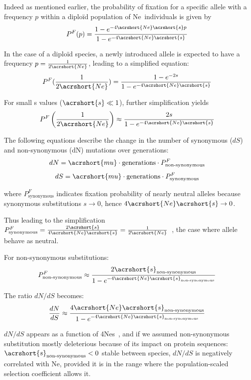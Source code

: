 Indeed as mentioned earlier, the probability of fixation for a specific allele with a frequency \( p \) within a \gls{diploïd} population of \acrshort{Ne}~individuals is given by
\[ P^F(p) = \frac{1 - e^{-4\acrshort{Ne}\acrshort{s} p}}{1 - e^{-4\acrshort{Ne}\acrshort{s}}} \]

In the case of a \gls{diploïd} species, a newly introduced allele is expected to have a frequency $p = \frac{1}{2\acrshort{Ne}}$, leading to a simplified equation:
\[ P^F(\frac{1}{2\acrshort{Ne}}) = \frac{1 - e^{-2s}}{1 - e^{-4\acrshort{Ne}\acrshort{s}}} \]

For small \acrshort{s} values ($\acrshort{s} \ll 1$), further simplification yields
\[ P^F\left(\frac{1}{2\acrshort{Ne}}\right) \approx \frac{2s}{1 - e^{-4\acrshort{Ne}\acrshort{s}}} \]

The following equations describe the change in the number of \gls{synonymous} ($dS$) and \gls{non-synonymous} (\gls{dN}) mutations over generations:
\[dN = \acrshort{mu} \cdot \text{generations} \cdot P^F_{\text{non-synonymous}}\]
\[dS = \acrshort{mu} \cdot \text{generations} \cdot P^F_{\text{synonymous}}\]

where \( P^F_{\text{synonymous}} \) indicates fixation probability of nearly neutral alleles because \gls{synonymous} substitutions $s \rightarrow 0$, hence $4\acrshort{Ne}\acrshort{s} \rightarrow 0$.

Thus leading to the simplification \( P^F_{\text{synonymous}} = \frac{2\acrshort{s}}{4\acrshort{Ne}\acrshort{s}} = \frac{1}{2\acrshort{Ne}} \)~\citep{kimura_probability_1962}, the case where allele behave as neutral.

For \gls{non-synonymous} substitutions:
\[P^F_{\text{non-synonymous}} \approx \frac{2\acrshort{s}_{\text{non-synonymous}}}{1 - e^{-4\acrshort{Ne}\acrshort{s}_{\text{non-synonymous}}}}\]


The ratio ${dN}/{dS}$ becomes:
\[\frac{dN}{dS} \approx \frac{4\acrshort{Ne}\acrshort{s}_{\text{non-synonymous}}}{1 - e^{-4\acrshort{Ne}\acrshort{s}_{\text{non-synonymous}}}}\]

${dN}/{dS}$ appears as a function of 4\acrshort{Ne}\acrshort{s}~\citep{nielsen_estimating_2003}, and if we assumed \gls{non-synonymous} \gls{substitution} mostly deleterious because of its impact on protein sequences: $\acrshort{s}_{\text{non-synonymous}}< 0$ stable between species, ${dN}/{dS}$ is negatively correlated with \acrshort{Ne}, provided it is in the range where the population-scaled selection coefficient allows it.

